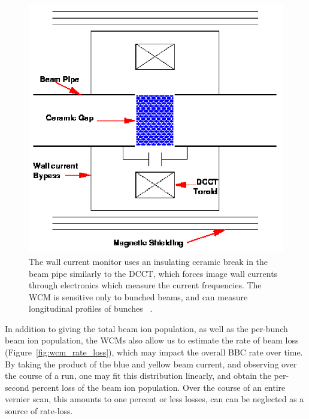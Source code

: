 \begin{figure}[ht]
  \begin{center}
    \includegraphics[width=0.75\linewidth]{./figures/dcct_schematic_cartoon}
    \caption{
      The wall current monitor uses an insulating ceramic break in the beam pipe
      similarly to the DCCT, which forces image wall currents through
      electronics which measure the current frequencies. The WCM is sensitive
      only to bunched beams, and can measure longitudinal profiles of bunches
      ~\cite{KawallFocus2004}.
    }
    \label{fig:dcct_schematic_cartoon}
  \end{center}
\end{figure}

In addition to giving the total beam ion population, as well as the per-bunch
beam ion population, the WCMs also allow us to estimate the rate of beam loss
(Figure~\ref{fig:wcm_rate_loss}), which may impact the overall BBC rate over
time. By taking the product of the blue and yellow beam current, and observing
over the course of a run, one may fit this distribution linearly, and obtain the
per-second percent loss of the beam ion population. Over the course of an entire
vernier scan, this amounts to one percent or less losses, can can be neglected
as a source of rate-loss.

